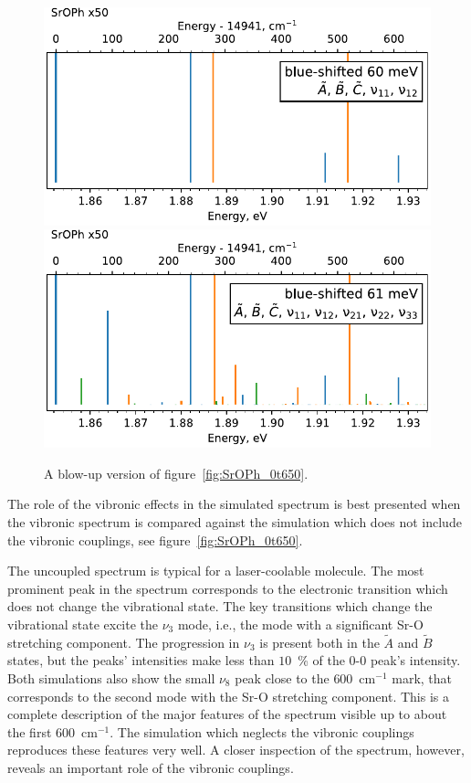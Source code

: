 \documentclass{article}
\begin{document}
\begin{figure}
    \begin{center}
        \includegraphics[width=12 cm]{figures/SrOPh_0t650_no_couplings_zoom.pdf}
        \includegraphics[width=12 cm]{figures/SrOPh_0t650_zoom.pdf}
    \end{center}
    \caption{
        A blow-up version of figure~\ref{fig:SrOPh_0t650}.
    }
    \label{fig:SrOPh_0t650_zoom}
\end{figure}

The role of the vibronic effects in the simulated spectrum is best presented
when the vibronic spectrum is compared against the simulation which does not
include the vibronic couplings, see figure~\ref{fig:SrOPh_0t650}.

The uncoupled spectrum is typical for a laser-coolable molecule. The most
prominent peak in the spectrum corresponds to the electronic transition which
does not change the vibrational state. The key transitions which change the
vibrational state excite the $\nu _3$ mode, i.e., the mode with a significant
Sr-O stretching component. The progression in $\nu _3$ is present both in the
$\tilde{A}$ and $\tilde{B}$ states, but the peaks' intensities make less than
$10$~\% of the 0-0 peak's intensity. Both simulations also show the small $\nu
_8$ peak close to the $600$~cm$^{-1}$ mark, that corresponds to the second mode
with the Sr-O stretching component. This is a complete description of the major
features of the spectrum visible up to about the first $600$~cm$^{-1}$. The
simulation which neglects the vibronic couplings reproduces these features very
well. A closer inspection of the spectrum, however, reveals an important role
of the vibronic couplings.
\end{document}
